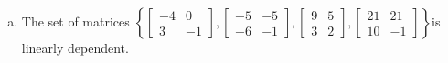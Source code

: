 \begin{exerciseAnswer}
\begin{enumerate}[(a)]
\item The set of matrices \( \left\{ \left[\begin{array}{cc}
-4 & 0 \\
3 & -1
\end{array}\right] , \left[\begin{array}{cc}
-5 & -5 \\
-6 & -1
\end{array}\right] , \left[\begin{array}{cc}
9 & 5 \\
3 & 2
\end{array}\right] , \left[\begin{array}{cc}
21 & 21 \\
10 & -1
\end{array}\right] \right\} \)is linearly dependent.
\end{enumerate}
    
\end{exerciseAnswer}
    
